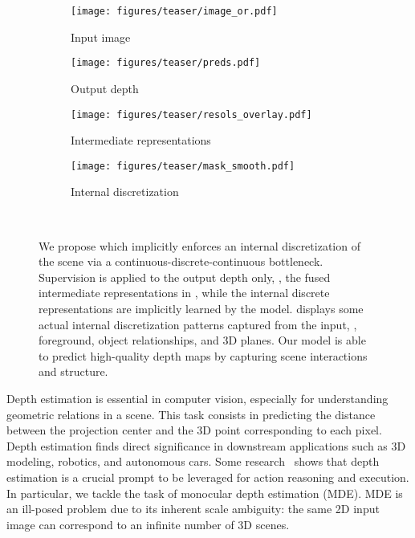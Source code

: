 \begin{figure}[ht]
    \centering
    \begin{subfigure}[b]{0.495\columnwidth}
        \centering
        \texttt{[image: figures/teaser/image\_or.pdf]}
        \caption{Input image}
    \end{subfigure}
    \begin{subfigure}[b]{0.495\columnwidth}
        \centering
        \texttt{[image: figures/teaser/preds.pdf]}
        \caption{Output depth}
    \end{subfigure}
    \par\smallskip
    \begin{subfigure}[b]{0.495\columnwidth}
        \centering
            \texttt{[image: figures/teaser/resols\_overlay.pdf]}
        \caption{Intermediate representations}
         \label{fig:intermediate_repr}
    \end{subfigure}
    \begin{subfigure}[b]{0.495\columnwidth}
        \centering
        \texttt{[image: figures/teaser/mask\_smooth.pdf]}
        \caption{Internal discretization}
        \label{fig:internal_disc}
    \end{subfigure}\\
    \vspace{-5pt}
    \caption{
    We propose \ourmodel which implicitly enforces an internal discretization of the scene via a continuous-discrete-continuous bottleneck. Supervision is applied to the output depth only, \ie, the fused intermediate representations in , while the internal discrete representations are implicitly learned by the model.  displays some actual internal discretization patterns captured from the input, \eg, foreground, object relationships, and 3D planes. Our \ourmodel model is able to predict high-quality depth maps by capturing scene interactions and structure.}
\label{fig:teaser}
\vspace{-15pt}
\end{figure}

Depth estimation is essential in computer vision, especially for understanding geometric relations in a scene. This task consists in predicting the distance between the projection center and the 3D point corresponding to each pixel. Depth estimation finds direct significance in downstream applications such as 3D modeling, robotics, and autonomous cars. Some research~\cite{Zhou2019} shows that depth estimation is a crucial prompt to be leveraged for action reasoning and execution. In particular, we tackle the task of monocular depth estimation (MDE). MDE is an ill-posed problem due to its inherent scale ambiguity: the same 2D input image can correspond to an infinite number of 3D scenes.

